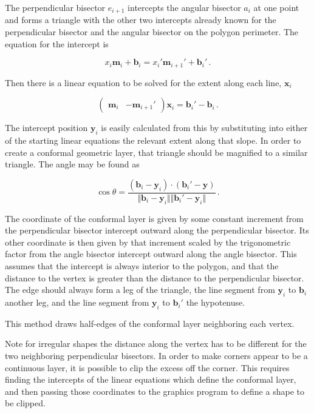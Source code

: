 \documentclass{article}
\begin{document}
The perpendicular bisector $e_{i+1}$ intercepts the angular bisector $a_i$ at one point and forms a triangle with the other two intercepts already known for the perpendicular bisector and the angular bisector on the polygon perimeter. The equation for the intercept is

$$ x_i \mathbf{m}_i + \mathbf{b}_{i} = x_i' \mathbf{m}_{i+1}' + \mathbf{b}_i'\,.$$

Then there is a linear equation to be solved for the extent along each line, $\mathbf{x}_i$

$$ \begin{pmatrix} \mathbf{m}_i & -\mathbf{m}_{i+1}' \end{pmatrix} \mathbf{x}_i = \mathbf{b}_i' - \mathbf{b}_i \,.$$

    The intercept position $\mathbf{y}_i$ is easily calculated from this by substituting into either of the starting linear equations the relevant extent along that slope. In order to create a conformal geometric layer, that triangle should be magnified to a similar triangle. The angle may be found as 

$$\cos\theta = \frac{ (\mathbf{b}_i - \mathbf{y}_i) \cdot (\mathbf{b}_i' - \mathbf{y}) }{ \Vert \mathbf{b}_i - \mathbf{y}_i \Vert \Vert \mathbf{b}_i' - \mathbf{y}_i \Vert } \,.  $$

The coordinate of the conformal layer is given by some constant increment from the perpendicular bisector intercept outward along the perpendicular bisector. Its other coordinate is then given by that increment scaled by the trigonometric factor from the angle bisector intercept outward along the angle bisector. This assumes that the intercept is always interior to the polygon, and that the distance to the vertex is greater than the distance to the perpendicular bisector. The edge should always form a leg of the triangle, the line segment from $\mathbf{y}_i$ to $\mathbf{b}_i$ another leg, and the line segment from $\mathbf{y}_i$ to $\mathbf{b}_i'$ the hypotenuse.

This method draws half-edges of the conformal layer neighboring each vertex.

Note for irregular shapes the distance along the vertex has to be different for the two neighboring perpendicular bisectors. In order to make corners appear to be a continuous layer, it is possible to clip the excess off the corner. This requires finding the intercepts of the linear equations which define the conformal layer, and then passing those coordinates to the graphics program to define a shape to be clipped.
\end{document}
